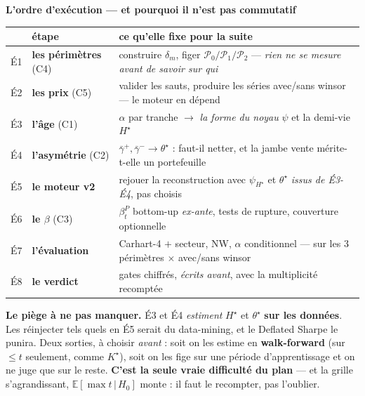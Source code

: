 \documentclass[11pt,a4paper]{article}
\begin{document}
\vspace{2mm}
{\color{bleu}\large\bfseries L'ordre d'exécution --- et pourquoi il n'est pas commutatif}\par
\vspace{0.5mm}
{\footnotesize
\begin{tabular}{@{}r l l@{}}
\toprule
 & étape & ce qu'elle fixe pour la suite \\\midrule
É1 & \textbf{les périmètres} (C4) & construire $\delta_m$, figer $\mathcal P_0/\mathcal P_1/\mathcal P_2$ --- \emph{rien ne se mesure avant de savoir sur qui} \\
É2 & \textbf{les prix} (C5) & valider les sauts, produire les séries avec/sans winsor --- le moteur en dépend \\
É3 & \textbf{l'âge} (C1) & $\alpha$ par tranche $\to$ \emph{la forme du noyau} $\psi$ et la demi-vie $H^{\star}$ \\
É4 & \textbf{l'asymétrie} (C2) & $\bar\gamma^{+},\bar\gamma^{-}\to\theta^{\star}$ : faut-il netter, et la jambe vente mérite-t-elle un portefeuille \\
É5 & \textbf{le moteur v2} & rejouer la reconstruction avec $\psi_{H^{\star}}$ et $\theta^{\star}$ \emph{issus de É3-É4}, pas choisis \\
É6 & \textbf{le $\beta$} (C3) & $\beta^P_t$ bottom-up \emph{ex-ante}, tests de rupture, couverture optionnelle \\
É7 & \textbf{l'évaluation} & Carhart-4 $+$ secteur, NW, $\alpha$ conditionnel --- sur les 3 périmètres $\times$ avec/sans winsor \\
É8 & \textbf{le verdict} & gates chiffrés, \emph{écrits avant}, avec la multiplicité recomptée \\
\bottomrule
\end{tabular}}

\vspace{1.5mm}
\begin{mdframed}[linecolor=rouge, backgroundcolor=rouge!5, linewidth=0.8pt, roundcorner=3pt]
\small\textbf{Le piège à ne pas manquer.} É3 et É4 \emph{estiment} $H^{\star}$ et $\theta^{\star}$ \textbf{sur les données}. Les réinjecter tels quels en É5 serait du data-mining, et le Deflated Sharpe le punira.
Deux sorties, à choisir \emph{avant} : soit on les estime en \textbf{walk-forward} (sur $\le t$ seulement, comme $K^{\star}$), soit on les fige sur une période d'apprentissage et on ne juge que sur le reste.
\textbf{C'est la seule vraie difficulté du plan} --- et la grille s'agrandissant, $\mathbb E[\max t\,|\,H_0]$ monte : il faut le recompter, pas l'oublier.
\end{mdframed}
\end{document}
